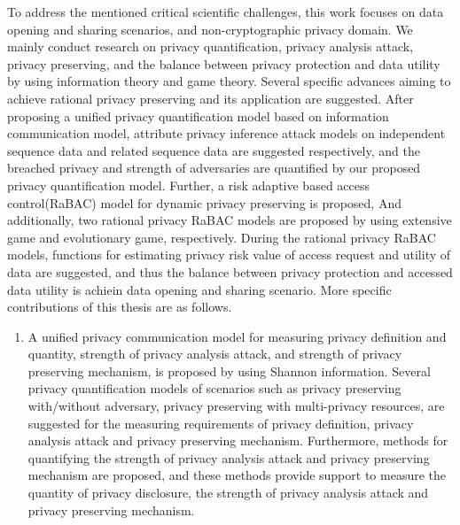 \begin{englishabstract}
	To address the mentioned critical scientific challenges, this work focuses on data opening and sharing scenarios, and non-cryptographic privacy domain. We mainly conduct research on privacy quantification, privacy analysis attack, privacy preserving, and the balance between privacy protection and data utility by using information theory and game theory. Several specific advances aiming to achieve rational privacy preserving and its application are suggested. After proposing a unified privacy quantification model based on information communication model,  attribute privacy inference attack models on independent sequence data and related sequence data are suggested respectively, and the breached privacy and strength of adversaries are quantified by our proposed  privacy quantification model. Further, a risk adaptive based access control(RaBAC) model for dynamic privacy preserving  is proposed, And additionally, two rational privacy RaBAC models are proposed by using extensive game and evolutionary game, respectively. During the rational privacy RaBAC models, functions for estimating privacy risk value of access request and utility of data are suggested, and thus the balance between privacy protection and accessed data utility is achiein data opening and sharing scenario. More specific contributions of this thesis are as follows.
	\begin{enumerate}
		\item 	
		A unified privacy communication model for measuring privacy definition and quantity, strength of privacy analysis attack, and strength of privacy preserving mechanism, is proposed by using Shannon information. 
		Several privacy quantification models of scenarios such as privacy preserving with/without adversary, privacy preserving with multi-privacy resources, are suggested for the measuring requirements of privacy definition, privacy analysis attack and privacy preserving mechanism. Furthermore, methods for quantifying the strength of  privacy analysis attack and privacy preserving mechanism are proposed, and these methods provide support to measure the quantity of privacy disclosure, the strength of  privacy analysis attack and privacy preserving mechanism.%


\end{enumerate}
\end{englishabstract}
